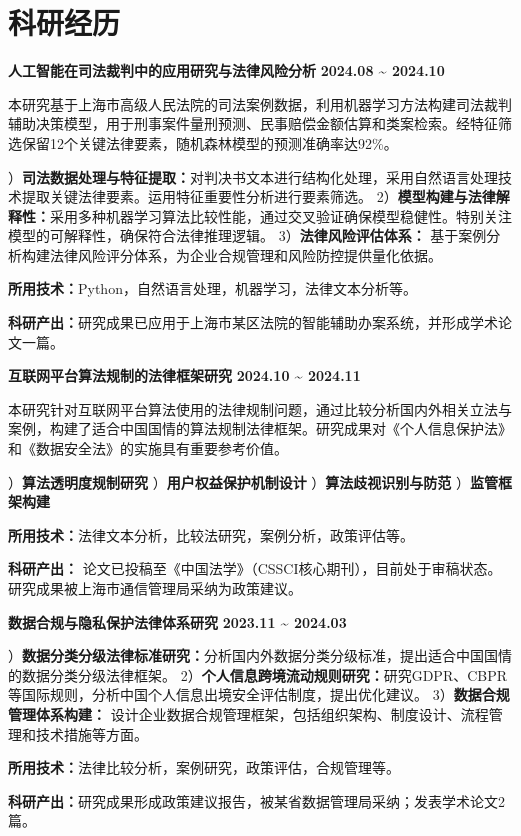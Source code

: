 \documentclass[11pt,a4paper]{ctexart}
\begin{document}
\section*{科研经历}
\vspace{-0.1em}
\noindent
\textcolor{sectioncolor}{\textbf{人工智能在司法裁判中的应用研究与法律风险分析}} \hfill \textcolor{sectioncolor}{\textbf{2024.08 \textasciitilde{} 2024.10}}
\par\noindent
本研究基于上海市高级人民法院的司法案例数据，利用机器学习方法构建司法裁判辅助决策模型，用于刑事案件量刑预测、民事赔偿金额估算和类案检索。经特征筛选保留12个关键法律要素，随机森林模型的预测准确率达92\%。
\par{}）\textbf{司法数据处理与特征提取：}对判决书文本进行结构化处理，采用自然语言处理技术提取关键法律要素。运用特征重要性分析进行要素筛选。
2）\textbf{模型构建与法律解释性：}采用多种机器学习算法比较性能，通过交叉验证确保模型稳健性。特别关注模型的可解释性，确保符合法律推理逻辑。
3）\textbf{法律风险评估体系：} 基于案例分析构建法律风险评分体系，为企业合规管理和风险防控提供量化依据。
\par\noindent
\textbf{所用技术：}Python，自然语言处理，机器学习，法律文本分析等。
\par\noindent
\textbf{科研产出：}研究成果已应用于上海市某区法院的智能辅助办案系统，并形成学术论文一篇。
\vspace{0.2em}

\noindent
\textcolor{sectioncolor}{\textbf{互联网平台算法规制的法律框架研究}} \hfill \textcolor{sectioncolor}{\textbf{2024.10 \textasciitilde{} 2024.11}}
\par\noindent
本研究针对互联网平台算法使用的法律规制问题，通过比较分析国内外相关立法与案例，构建了适合中国国情的算法规制法律框架。研究成果对《个人信息保护法》和《数据安全法》的实施具有重要参考价值。
\par{}）\textbf{算法透明度规制研究} ）\textbf{用户权益保护机制设计} ）\textbf{算法歧视识别与防范} ）\textbf{监管框架构建}
\par\noindent
\textbf{所用技术：}法律文本分析，比较法研究，案例分析，政策评估等。
\par\noindent
\textbf{科研产出：} 论文已投稿至《中国法学》（CSSCI核心期刊），目前处于审稿状态。研究成果被上海市通信管理局采纳为政策建议。
\vspace{0.2em}

\noindent
\textcolor{sectioncolor}{\textbf{数据合规与隐私保护法律体系研究}} \hfill \textcolor{sectioncolor}{\textbf{2023.11 \textasciitilde{} 2024.03}}
\par{}）\textbf{数据分类分级法律标准研究：}分析国内外数据分类分级标准，提出适合中国国情的数据分类分级法律框架。
2）\textbf{个人信息跨境流动规则研究：}研究GDPR、CBPR等国际规则，分析中国个人信息出境安全评估制度，提出优化建议。
3）\textbf{数据合规管理体系构建：} 设计企业数据合规管理框架，包括组织架构、制度设计、流程管理和技术措施等方面。
\par\noindent
\textbf{所用技术：}法律比较分析，案例研究，政策评估，合规管理等。
\par\noindent
\textbf{科研产出：}研究成果形成政策建议报告，被某省数据管理局采纳；发表学术论文2篇。
\vspace{0.2em}
\end{document}
